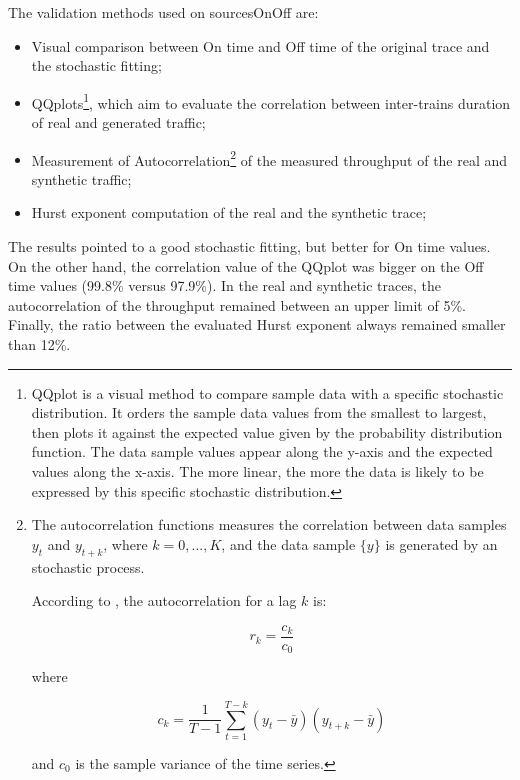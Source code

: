 The validation methods used on sourcesOnOff are: 
\begin{itemize}
\item Visual comparison between On time and Off time of the original trace and the stochastic fitting;
\item QQplots\footnote{
QQplot is a visual method to compare sample data with a specific stochastic distribution. It orders the sample data values from the smallest to largest, then plots it against the expected value given by the probability distribution function. The data sample values appear along the y-axis and the expected values along the x-axis. The more linear, the more the data is likely to be expressed by this specific stochastic distribution.
}, which aim to evaluate the correlation between inter-trains duration of real and generated traffic;
\item Measurement of Autocorrelation\footnote{
The autocorrelation functions measures the correlation between data samples $y_{t}$ and $y_{t + k}$, where $k =0, ..., K$, and the data sample $\{y\}$  is generated by an stochastic process.

According to \cite{book-time-series-analysis}, the autocorrelation for a lag $k$ is:

\begin{equation}
r_{k} = \frac{c_{k}}{c_{0}}
\end{equation}

where 

\begin{equation}
c_{k} = \frac{1}{T - 1}\sum_{t = 1}^{T - k} (y_{t} - \bar{y})(y_{t+k} - \bar{y})
\end{equation}

and $c_{0}$ is the sample variance of the time series. 
} of the measured throughput of the real and synthetic traffic;
\item Hurst exponent computation of the real and the synthetic trace;
\end{itemize}

The results pointed to a good stochastic fitting, but better for On time values. On the other hand, the correlation value of the QQplot was bigger on the Off time values (99.8\% versus 97.9\%). In the real and synthetic traces, the autocorrelation of the throughput remained between an upper limit of 5\%. Finally, the ratio between the evaluated Hurst exponent always remained smaller than 12\%.


